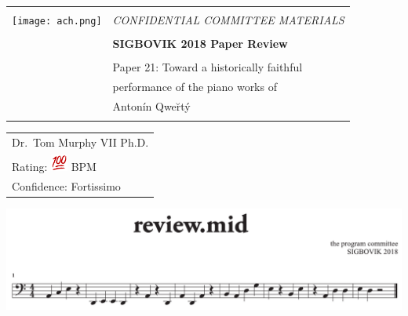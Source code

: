 \documentclass[12pt]{article}
\begin{document}
{\sffamily
\begin{tabular}{ll}
\multirow{3}{*}{\texttt{[image: ach.png]}}\\
& \Large{\em CONFIDENTIAL COMMITTEE MATERIALS} \\
&\\
& \textbf{\Huge{SIGBOVIK 2018 Paper Review}} \\
&\\
& \LARGE{Paper 21: Toward a historically faithful } \\[0.25em]
& \LARGE{performance of the piano works of } \\[0.25em]
& \LARGE{Anton\' in Qwe\u rt\' y} \\
&\\
\hline
\end{tabular}}
\vspace{2em}
\thispagestyle{empty}

{\large\bf
\begin{tabular}{l}
Dr.~Tom Murphy VII Ph.D. \\
Rating: \includegraphics[width=1.5em]{emoji100} BPM \\
Confidence: Fortissimo\\
\end{tabular}}
\vspace{1em}

\includegraphics[width=\textwidth]{review-21-midi}
\end{document}

